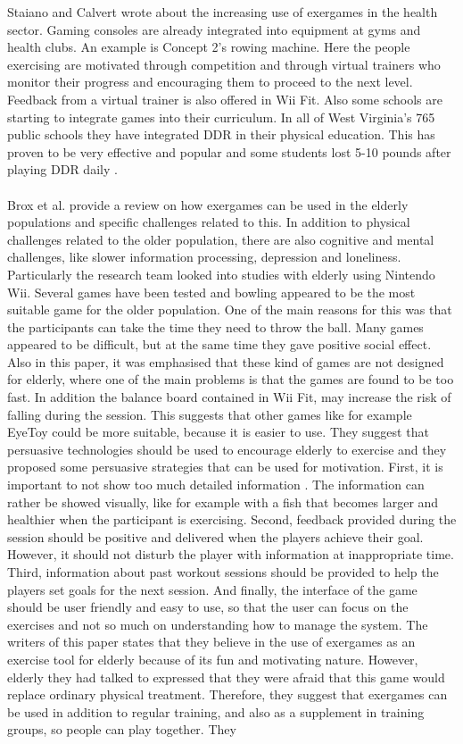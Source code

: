 Staiano and Calvert \cite{staiano2011exergames} wrote about the increasing use of exergames in the health sector. Gaming consoles are already integrated into equipment at gyms and health clubs. An example is Concept 2’s rowing machine. Here the people exercising are motivated through competition and through virtual trainers who monitor their progress and encouraging them to proceed to the next level. Feedback from a virtual trainer is also offered in Wii Fit. Also some schools are starting to integrate games into their curriculum. In all of West Virginia’s 765 public schools they have integrated DDR in their physical education. This has proven to be very effective and popular and some students lost 5-10 pounds after playing DDR daily \cite{staiano2011exergames}. \\ \\
Brox et al. \cite{exergamesforelderly} provide a review on how exergames can be used in the elderly populations and specific challenges related to this. In addition to physical challenges related to the older population, there are also cognitive and  mental challenges, like slower information processing, depression and loneliness. Particularly the research team  looked into studies with elderly using Nintendo Wii. Several games have been tested and bowling appeared to be the most suitable game for the older population. One of the main reasons for this was that the participants can take the time they need to throw the ball. Many games appeared to be difficult, but at the same time they gave positive social effect. Also in this paper, it was emphasised that these kind of games are not designed for elderly, where one of the main problems is that the games are found to be too fast. In addition the balance board contained in Wii Fit, may increase the risk of falling during the session. This suggests that other games like for example EyeToy could be more suitable, because it is easier to use. They suggest that persuasive technologies should be used to encourage elderly to exercise and they proposed some persuasive strategies that can be used for motivation. First, it is important to not show too much  detailed information . The information can rather be showed visually, like for example with a fish that becomes larger and healthier when the participant is exercising. Second, feedback provided during the session should be positive and delivered when the players achieve their goal. However, it should not disturb the player with information at inappropriate time. Third, information about past workout sessions should be  provided to help the players set goals for the next session. And finally, the interface of the game should be user friendly and easy to use, so that the user can focus on the exercises and not so much on understanding how to manage the system.  The writers of this paper states that they believe in the use of exergames as an exercise tool for elderly because of its fun and motivating nature. However, elderly they had talked to expressed that they were afraid that this game would replace ordinary physical treatment. Therefore, they suggest that exergames can be used in addition to regular training, and also as a supplement in training groups, so people can play together. They 